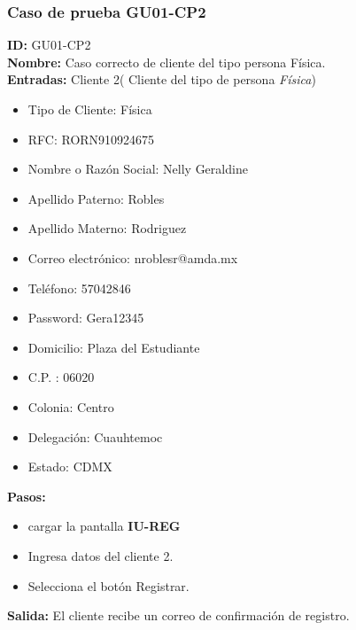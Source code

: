\subsubsection{Caso de prueba GU01-CP2}
\textbf{ID:} GU01-CP2\\
\textbf{Nombre:} Caso correcto de cliente del tipo persona Física.\\
\textbf{Entradas:} 
Cliente 2( Cliente del tipo de persona \textit{Física})
\begin{itemize}
    \item Tipo de Cliente: Física
    \item RFC: RORN910924675
    \item Nombre o Razón Social: Nelly Geraldine 
    \item Apellido Paterno: Robles
    \item Apellido Materno: Rodriguez
    \item Correo electrónico: nroblesr@amda.mx
    \item Teléfono: 57042846
    \item Password: Gera12345
    \item Domicilio: Plaza del Estudiante
    \item C.P. : 06020
    \item Colonia: Centro 
    \item Delegación: Cuauhtemoc
    \item Estado: CDMX\\
\end{itemize}
\textbf{Pasos:}
\begin{itemize}
\item cargar la pantalla \textbf{IU-REG}
    \item Ingresa datos del cliente 2.
    \item Selecciona el botón Registrar.
\end{itemize}
\textbf{Salida:}
El cliente recibe un correo de confirmación de registro. 

